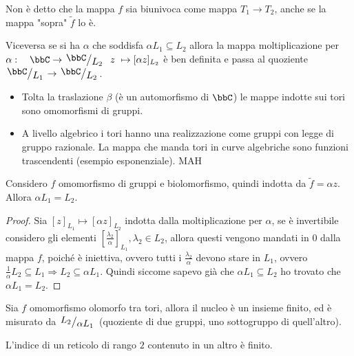 
\begin{osservazione}
Non è detto che la mappa $f$ sia biunivoca come mappa $T_1\rightarrow T_2$, anche se la mappa "sopra" $\tilde{f}$ lo è.
\end{osservazione}

Viceversa se si ha $\alpha$ che soddisfa $\alpha L_1 \subseteq L_2$  allora la mappa moltiplicazione per $\alpha: \quad \bbC \rightarrow \quotient{\bbC}{L_2} \hquad z\ \mapsto [\alpha z]_{L_2} $ è ben definita e passa al quoziente $\quotient{\bbC}{L_1}\rightarrow \quotient{\bbC}{L_2}$.

\begin{osservazione}
\begin{itemize}
\item Tolta la traslazione $\beta$ (è un automorfismo di $\bbC$) le mappe indotte sui tori sono omomorfismi di gruppi.
\item A livello algebrico i tori hanno una realizzazione come gruppi con legge di gruppo razionale.
La mappa che manda tori in curve algebriche sono funzioni trascendenti (esempio esponenziale). MAH
\end{itemize}
\end{osservazione}


\begin{fatto} Considero $f$ omomorfismo di gruppi e biolomorfismo, quindi indotta da $\tilde{f}=\alpha z$. Allora $\alpha L_1=L_2$.
\end{fatto}
\begin{proof}
Sia $[z]_{L_1} \mapsto [\alpha z]_{L_2}$ indotta dalla moltiplicazione per $\alpha$, se è invertibile considero gli elementi $[\frac{\lambda_2}{\alpha}]_{L_1}, \lambda_2 \in L_2$, allora questi vengono mandati in $0$ dalla mappa $f$, poiché è iniettiva, ovvero tutti i $\frac{\lambda_2}{\alpha}$ devono stare in $L_1$, ovvero $\frac{1}{\alpha} L_2 \subseteq L_1 \Rightarrow L_2 \subseteq \alpha L_1$.
Quindi siccome sapevo già che $\alpha L_1 \subseteq L_2$ ho trovato che $\alpha L_1 =L_2$.
\end{proof}

\begin{esercizio} Sia $f$ omomorfismo olomorfo tra tori, allora il nucleo è un insieme finito, ed è misurato da $\quotient{L_2}{\alpha L_1}$ (quoziente di due gruppi, uno sottogruppo di quell'altro).
\end{esercizio}

\begin{esercizio}
L'indice di un reticolo di rango $2$ contenuto in un altro è finito.
\end{esercizio}

